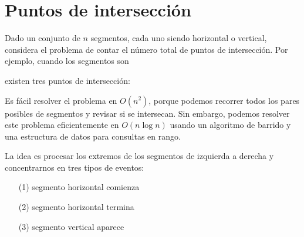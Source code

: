 \section{Puntos de intersección}


Dado un conjunto de $n$ segmentos, cada uno siendo horizontal o vertical,
considera el problema de contar el número total de puntos de intersección.
Por ejemplo, cuando los segmentos son
\begin{center}
\end{center}
existen tres puntos de intersección:
\begin{center}
\end{center}

Es fácil resolver el problema en $O(n^2)$, porque podemos recorrer todos los
pares posibles de segmentos y revisar si se intersecan. Sin embargo, podemos
resolver este problema eficientemente en $O(n \log n)$ usando un algoritmo de
barrido y una estructura de datos para consultas en rango.

La idea es procesar los extremos de los segmentos de izquierda a derecha y
concentrarnos en tres tipos de eventos:
\begin{enumerate}[noitemsep]
    \item[(1)] segmento horizontal comienza
    \item[(2)] segmento horizontal termina
    \item[(3)] segmento vertical aparece
\end{enumerate}

